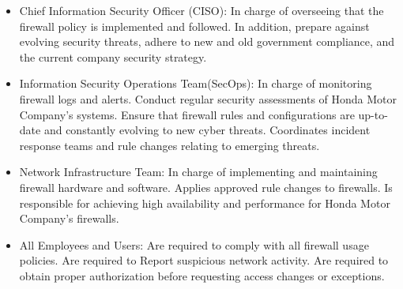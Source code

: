 \begin{itemize}
    \item Chief Information Security Officer (CISO): In charge of overseeing that the firewall policy is implemented and followed. In addition, prepare against evolving security threats, adhere to new and old government compliance, and the current company security strategy.

    
    \item Information Security Operations Team(SecOps): In charge of monitoring firewall logs and alerts. Conduct regular security assessments of Honda Motor Company's systems. Ensure that firewall rules and configurations are up-to-date and constantly evolving to new cyber threats. Coordinates incident response teams and rule changes relating to emerging threats.

    
    \item Network Infrastructure Team: In charge of implementing and maintaining firewall hardware and software. Applies approved rule changes to firewalls. Is responsible for achieving high availability and performance for Honda Motor Company's firewalls.

    
    \item All Employees and Users: Are required to comply with all firewall usage policies. Are required to Report suspicious network activity. Are required to obtain proper authorization before requesting access changes or exceptions.

\end{itemize}
